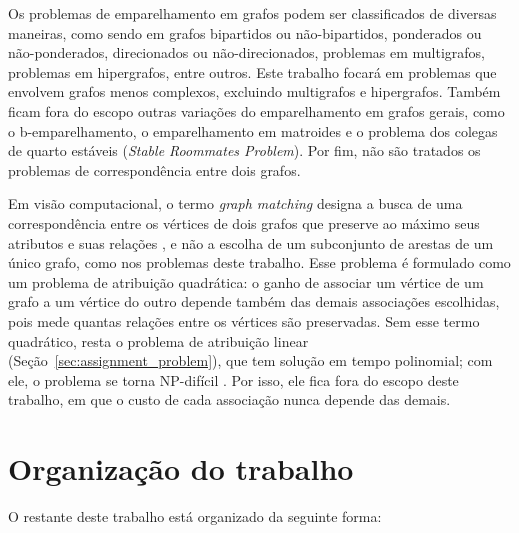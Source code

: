 Os problemas de emparelhamento em grafos podem ser classificados de diversas maneiras, como sendo em grafos bipartidos ou não-bipartidos, ponderados ou não-ponderados, direcionados ou não-direcionados, problemas em multigrafos, problemas em hipergrafos, entre outros. Este trabalho focará em problemas que envolvem grafos menos complexos, excluindo multigrafos e hipergrafos. Também ficam fora do escopo outras variações do emparelhamento em grafos gerais, como o b-emparelhamento, o emparelhamento em matroides e o problema dos colegas de quarto estáveis (\textit{Stable Roommates Problem}). Por fim, não são tratados os problemas de correspondência entre dois grafos.

Em visão computacional, o termo \textit{graph matching} designa a busca de uma correspondência entre os vértices de dois grafos que preserve ao máximo seus atributos e suas relações \cite{learning_graph_matching}, e não a escolha de um subconjunto de arestas de um único grafo, como nos problemas deste trabalho. Esse problema é formulado como um problema de atribuição quadrática: o ganho de associar um vértice de um grafo a um vértice do outro depende também das demais associações escolhidas, pois mede quantas relações entre os vértices são preservadas. Sem esse termo quadrático, resta o problema de atribuição linear (Seção~\ref{sec:assignment_problem}), que tem solução em tempo polinomial; com ele, o problema se torna NP-difícil \cite{learning_graph_matching, burkard}. Por isso, ele fica fora do escopo deste trabalho, em que o custo de cada associação nunca depende das demais.

\section{Organização do trabalho}

O restante deste trabalho está organizado da seguinte forma:

